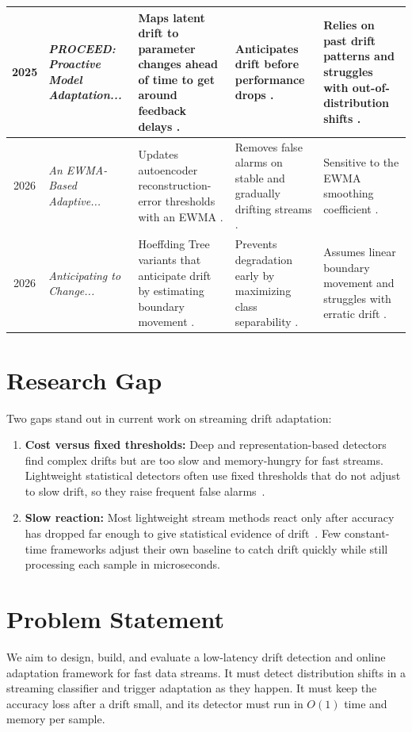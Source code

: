 \documentclass[conference]{IEEEtran}
\begin{document}
\begin{table}[htbp]
\begin{center}
\begin{tabular}{|c|p{}|p{}|p{}|p{}|}
\hline
2025 & \textit{PROCEED: Proactive Model Adaptation...} \cite{zhao2025} & Maps latent drift to parameter changes ahead of time to get around feedback delays \cite{zhao2025}. & Anticipates drift before performance drops \cite{zhao2025}. & Relies on past drift patterns and struggles with out-of-distribution shifts \cite{zhao2025}. \\
\hline
2026 & \textit{An EWMA-Based Adaptive...} \cite{rum2026} & Updates autoencoder reconstruction-error thresholds with an EWMA \cite{rum2026}. & Removes false alarms on stable and gradually drifting streams \cite{rum2026}. & Sensitive to the EWMA smoothing coefficient \cite{rum2026}. \\
\hline
2026 & \textit{Anticipating to Change...} \cite{cano2026} & Hoeffding Tree variants that anticipate drift by estimating boundary movement \cite{cano2026}. & Prevents degradation early by maximizing class separability \cite{cano2026}. & Assumes linear boundary movement and struggles with erratic drift \cite{cano2026}. \\
\hline
\end{tabular}
\label{tab:lit_survey}
\end{center}
\end{table}

\section{Research Gap}
Two gaps stand out in current work on streaming drift adaptation:
\begin{enumerate}
    \item \textbf{Cost versus fixed thresholds:} Deep and representation-based detectors~\cite{wan2024, chambers2023} find complex drifts but are too slow and memory-hungry for fast streams. Lightweight statistical detectors often use fixed thresholds that do not adjust to slow drift, so they raise frequent false alarms~\cite{rum2026}.
    \item \textbf{Slow reaction:} Most lightweight stream methods react only after accuracy has dropped far enough to give statistical evidence of drift~\cite{cano2026}. Few constant-time frameworks adjust their own baseline to catch drift quickly while still processing each sample in microseconds.
\end{enumerate}

\section{Problem Statement}
We aim to design, build, and evaluate a low-latency drift detection and online adaptation framework for fast data streams.
It must detect distribution shifts in a streaming classifier and trigger adaptation as they happen.
It must keep the accuracy loss after a drift small, and its detector must run in $O(1)$ time and memory per sample.
\end{document}
